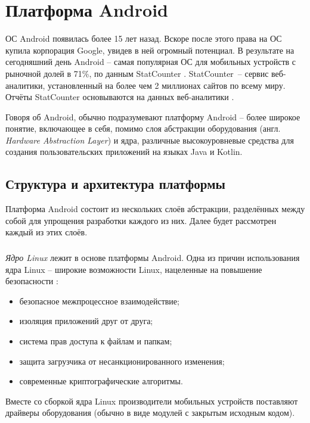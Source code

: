 
\section{Платформа Android}
\label{sec:android_platform}

ОС Android появилась более 15 лет назад.
Вскоре после этого права на ОС купила корпорация Google, увидев в ней огромный потенциал.
В результате на сегодняшний день Android -- самая популярная ОС для мобильных устройств с рыночной долей в 71\%, по данным StatCounter \cite{statcounter_mobile_os}.
StatCounter~-- сервис веб-аналитики, установленный на более чем 2 миллионах сайтов по всему миру.
Отчёты StatCounter основываются на данных веб-аналитики \cite{statcounter_methodology}.

Говоря об Android, обычно подразумевают платформу Android -- более широкое понятие, включающее в себя, помимо слоя абстракции оборудования (англ. \textit{Hardware Abstraction Layer}) и ядра, различные высокоуровневые средства для создания пользовательских приложений на языках Java и Kotlin.

\subsection{Структура и архитектура платформы}
\label{sub:android_platform:struct_and_arch}

Платформа Android состоит из нескольких слоёв абстракции, разделённых между собой для упрощения разработки каждого из них.
Далее будет рассмотрен каждый из этих слоёв.

\subsubsection{}
\label{subsub:android_platform:struct_and_arch:linux}
\textit{Ядро Linux} лежит в основе платформы Android.
Одна из причин использования ядра Linux -- широкие возможности Linux, нацеленные на повышение безопасности \cite{android_kernel_security}:
\begin{itemize}
	\item безопасное межпроцессное взаимодействие;
	\item изоляция приложений друг от друга;
	\item система прав доступа к файлам и папкам;
	\item защита загрузчика от несанкционированного изменения;
	\item современные криптографические алгоритмы.
\end{itemize}
Вместе со сборкой ядра Linux производители мобильных устройств поставляют драйверы оборудования (обычно в виде модулей с закрытым исходным кодом).

